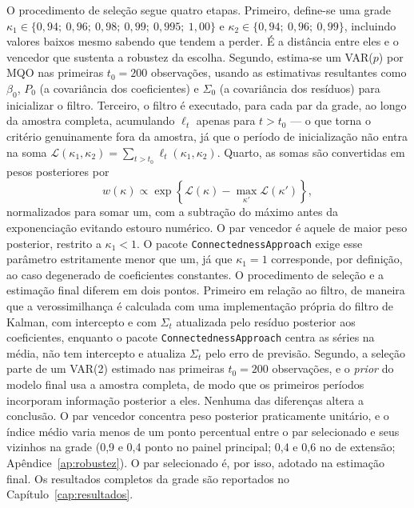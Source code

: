 \documentclass[12pt, a4paper, oneside, english, brazil]{abntex2}
\begin{document}
O procedimento de seleção segue quatro etapas. Primeiro, define-se uma grade
$\kappa_1 \in \{0{,}94;\ 0{,}96;\ 0{,}98;\ 0{,}99;\ 0{,}995;\ 1{,}00\}$ e
$\kappa_2 \in \{0{,}94;\ 0{,}96;\ 0{,}99\}$, incluindo valores baixos mesmo
sabendo que tendem a perder. É a distância entre eles e o
vencedor que sustenta a robustez da escolha. Segundo, estima-se um VAR($p$)
por MQO nas primeiras $t_0 = 200$ observações, usando as estimativas
resultantes como $\beta_0$, $P_0$ (a covariância dos coeficientes) e $\Sigma_0$
(a covariância dos resíduos) para inicializar o filtro. Terceiro, o filtro é
executado, para cada par da grade, ao longo da amostra completa, acumulando
$\ell_t$ apenas para $t > t_0$ — o que torna o critério genuinamente fora da
amostra, já que o período de inicialização não entra na soma
$\mathcal{L}(\kappa_1, \kappa_2) = \sum_{t > t_0} \ell_t(\kappa_1, \kappa_2)$.
Quarto, as somas são convertidas em pesos posteriores por
\begin{equation}
    w(\kappa) \propto \exp\!\left\{\mathcal{L}(\kappa) - \max_{\kappa'} \mathcal{L}(\kappa')\right\},
    \label{eq:pesos}
\end{equation}
normalizados para somar um, com a subtração do máximo antes da exponenciação
evitando estouro numérico. O par vencedor é aquele de maior peso posterior,
restrito a $\kappa_1 < 1$. O pacote \texttt{ConnectednessApproach} exige esse
parâmetro estritamente menor que um, já que $\kappa_1 = 1$ corresponde, por
definição, ao caso degenerado de coeficientes constantes. O procedimento de seleção e a 
estimação final diferem em dois pontos. Primeiro em relação ao
filtro, de maneira que a verossimilhança é calculada com uma implementação própria do filtro
de Kalman, com intercepto e com $\Sigma_t$ atualizada pelo resíduo posterior
aos coeficientes, enquanto o pacote \texttt{ConnectednessApproach} centra as
séries na média, não tem intercepto e atualiza $\Sigma_t$ pelo erro de
previsão. Segundo, a seleção parte de um VAR(2) estimado nas
primeiras $t_0 = 200$ observações, e o \textit{prior} do modelo final usa a
amostra completa, de modo que os primeiros períodos incorporam informação
posterior a eles. Nenhuma das diferenças altera a conclusão. O par vencedor
concentra peso posterior praticamente unitário, e o índice médio varia menos de um ponto
percentual entre o par selecionado e seus vizinhos na grade (0,9 e 0,4 ponto no painel
principal; 0,4 e 0,6 no de extensão; Apêndice~\ref{ap:robustez}). O par selecionado é, por isso, adotado na
estimação final. Os resultados
completos da grade são reportados no Capítulo~\ref{cap:resultados}.
\end{document}
